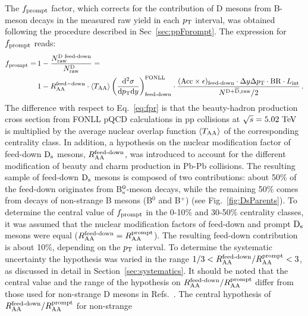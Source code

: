The $f_{\rm prompt}$ factor, which corrects for the contribution of 
D mesons from B-meson decays in the measured raw yield 
in each $p_{\rm T}$ interval, was obtained following the procedure described in Sec~\ref{sec:ppFprompt}. 
The expression for $f_{\rm prompt}$ reads:
\begin{equation}
\label{eq:fprAA}
\begin{split}
f_{\mathrm{prompt}} = \, & 1- \frac{N^{\text{D~feed-down}}_{\mathrm{raw}}}{N^{\mathrm{D}}_{\mathrm{raw}}}=\\
& 1- R_{\rm AA} ^{\rm feed-down} \cdot  \langle T_{\rm AA} \rangle \left (\frac{\rm d^2 \sigma}{\mathrm dp_{\rm T} \mathrm d y} \right)^{\rm FONLL}_{\text{feed-down}} \cdot  \frac{(\mathrm{Acc} \times \epsilon)_\text{feed-down} \cdot \Delta y \Delta p_{\rm T} \cdot \mathrm{BR} \cdot L_{\rm int}}{N^{\rm D +\overline{D},raw}/2}\,.
\end{split}
\end{equation}
The difference with respect to Eq.~\ref{eq:fpr} is that the beauty-hadron 
production cross section from FONLL pQCD
calculations in pp collisions at $\sqrt{s}=5.02~\mathrm{TeV}$~\cite{Cacciari:2012ny}
is multiplied by the average nuclear overlap function $\langle T_{\rm AA} \rangle$ of the corresponding centrality class. 
In addition, a hypothesis on the nuclear 
modification factor of feed-down ${\rm D_s}$ mesons, $R_{\rm AA}^{\textnormal{feed-down}}$, was 
introduced to account for the different modification of beauty and charm 
production in Pb-Pb collisions. The resulting sample of 
feed-down ${\rm D_s}$ mesons is composed of two 
contributions: about 50\% of the feed-down originates from 
B$^0_{\rm s}$-meson decays, while the remaining 50\% comes from decays of 
non-strange B mesons (B$^0$ and B$^+$) (see Fig.~\ref{fig:DsParents}).
To determine the central value of $f_{\rm prompt}$ in the 0-10\% 
and 30-50\% centrality classes, it was assumed that the 
nuclear modification factors of feed-down and prompt ${\rm D_s}$ mesons were equal 
($R_{\rm AA}^{\textnormal{feed-down}}=R_{\rm AA}^{\rm prompt}$). 
The resulting feed-down contribution is about 10\%, depending on the
$p_{\rm T}$ interval.
To determine the systematic uncertainty the hypothesis
was varied in the range $1/3<R_{\rm AA}^{\textnormal{feed-down}}/R_{\rm AA}^{\rm prompt}<3$, as 
discussed in detail in Section~\ref{sec:systematics}.
It should be noted that the central value and the range of the hypothesis
on $R_{\rm AA}^{\textnormal{feed-down}}/R_{\rm AA}^{\rm prompt}$ differ from those used for
non-strange D mesons in Refs.~\cite{ALICE-PUBLIC-2017-003,Adam:2015sza}. The 
central hypothesis of $R_{\rm AA}^{\textnormal{feed-down}}/R_{\rm AA}^{\rm prompt}$ for non-strange
